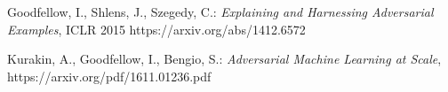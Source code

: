 \documentclass[11pt]{article} %
\begin{document}
\begin{thebibliography}{10}
Goodfellow, I., Shlens, J., Szegedy, C.:
\textit{Explaining and Harnessing Adversarial Examples},
 ICLR 2015 https://arxiv.org/abs/1412.6572
 
 Kurakin, A., Goodfellow, I., Bengio, S.:
 \textit{Adversarial Machine Learning at Scale},
 https://arxiv.org/pdf/1611.01236.pdf
\end{thebibliography}


 
\end{document}
